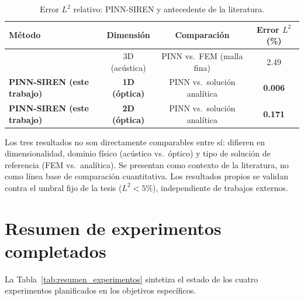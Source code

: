 \begin{table}[htbp]
\centering
\begin{threeparttable}
\caption{Error $L^2$ relativo: PINN-SIREN y antecedente de la literatura.}
\label{tab:comparativa}
\begin{tabular}{lccc}
\toprule
Método & Dimensión & Comparación & Error $L^2$ (\%) \\
\midrule
\textcite{schoder2024helmholtz} & 3D (acústica) & PINN vs.\ FEM (malla fina) & 2.49 \\
\textbf{PINN-SIREN (este trabajo)} & \textbf{1D (óptica)} & PINN vs.\ solución analítica & \textbf{0.006} \\
\textbf{PINN-SIREN (este trabajo)} & \textbf{2D (óptica)} & PINN vs.\ solución analítica & \textbf{0.171} \\
\bottomrule
\end{tabular}
\begin{tablenotes}\small
    \item Los tres resultados no son directamente comparables entre sí:
    difieren en dimensionalidad, dominio físico (acústico vs.\ óptico) y tipo
    de solución de referencia (FEM vs.\ analítica). Se presentan como
    contexto de la literatura, no como línea base de comparación
    cuantitativa. Los resultados propios se validan contra el umbral fijo de
    la tesis ($L^2 < 5\%$), independiente de trabajos externos.
\end{tablenotes}
\end{threeparttable}
\end{table}

\section{Resumen de experimentos completados}

La Tabla~\ref{tab:resumen_experimentos} sintetiza el estado de los cuatro
experimentos planificados en los objetivos específicos.

